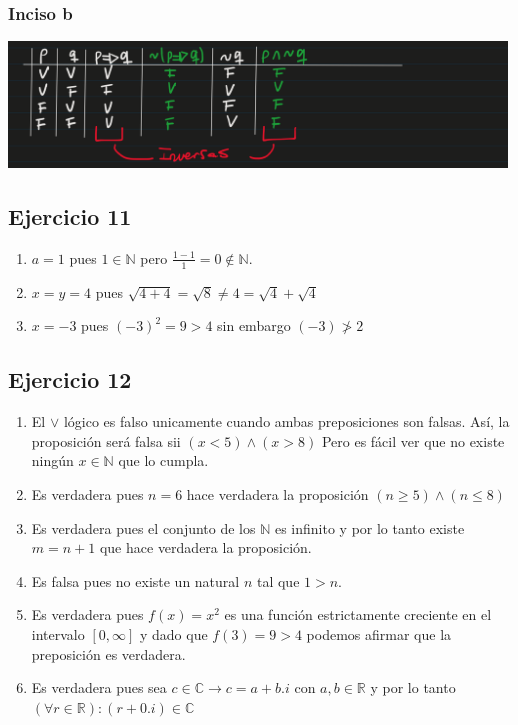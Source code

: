 \subsubsection{Inciso b}
\includegraphics[width=500px]{1.11}

\subsection{Ejercicio 11}
\begin{enumerate}[label=(\alph*)]
    \item $a = 1$ pues $1 \in \mathbb{N}$ pero $\frac{1-1}{1} = 0 \not \in \mathbb{N}$.
    \item $x = y = 4$ pues $\sqrt{4+4} = \sqrt{8} \neq 4 = \sqrt{4} + \sqrt{4}$
    \item $x = -3$ pues $(-3)^2 = 9 > 4$ sin embargo $(-3) \not > 2$
\end{enumerate}

\subsection{Ejercicio 12}
\begin{enumerate}[label=(\alph*)]
    \item El $\vee$ lógico es falso unicamente cuando ambas preposiciones son falsas. Así, la proposición será falsa sii $(x < 5) \wedge (x > 8)$
            Pero es fácil ver que no existe ningún $x \in \mathbb{N}$ que lo cumpla.
    \item Es verdadera pues $n = 6$ hace verdadera la proposición $(n \geq 5) \wedge (n \leq 8)$
    \item Es verdadera pues el conjunto de los $\mathbb{N}$ es infinito y por lo tanto existe $m = n+1$ que hace verdadera la proposición.
    \item Es falsa pues no existe un natural $n$ tal que $1 > n$.
    \item Es verdadera pues $f(x) = x^2$ es una función estrictamente creciente en el intervalo $[0, \infty]$ y dado que $f(3) = 9 > 4$ podemos afirmar que la preposición es verdadera.
    \item Es verdadera pues sea $c \in \mathbb{C} \rightarrow c = a+b.i$ con $a,b \in \mathbb{R}$ y por lo tanto $(\forall r \in \mathbb{R}): (r + 0.i) \in \mathbb{C} $
\end{enumerate}

